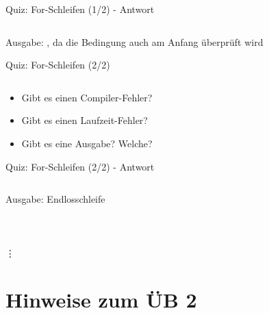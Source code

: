 \documentclass[usepdftitle=false,hyperref={pdfpagelabels=false}]{beamer}
\begin{document}
\begin{frame}{Quiz: For-Schleifen (1/2) - Antwort}
    \inputminted[linenos=true, numbersep=5pt, tabsize=4, fontsize=\small, label=QuizFor.java, frame=lines]{java}{QuizFor.java}
    Ausgabe: , da die Bedingung auch am Anfang überprüft wird
\end{frame}

\begin{frame}{Quiz: For-Schleifen (2/2)}
    \inputminted[linenos=true, numbersep=5pt, tabsize=4, fontsize=\small, label=QuizFor.java, frame=lines]{java}{QuizFor-2.java}
    \begin{itemize}
        \item Gibt es einen Compiler-Fehler?
        \item Gibt es einen Laufzeit-Fehler?
        \item Gibt es eine Ausgabe? Welche?
    \end{itemize}
\end{frame}

\begin{frame}{Quiz: For-Schleifen (2/2) - Antwort}
    \inputminted[linenos=true, numbersep=5pt, tabsize=4, fontsize=\small, label=QuizFor.java, frame=lines]{java}{QuizFor-2.java}
    Ausgabe: Endlosschleife\\
        \\
        \\
        \\
        \vdots
\end{frame}

\section{Hinweise zum ÜB 2}
\end{document}
